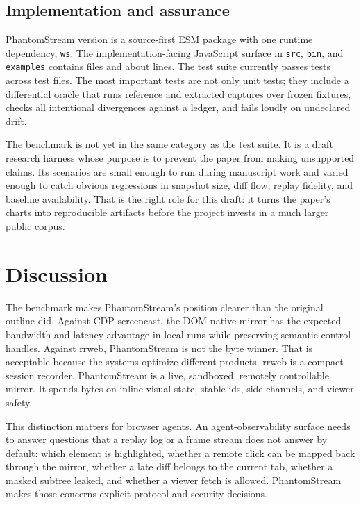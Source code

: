 \documentclass[conference]{IEEEtran}
\newcommand{\code}[1]{\texttt{\small #1}}
\begin{document}
\subsection{Implementation and assurance}

PhantomStream version \PSPackageVersion{} is a source-first ESM package with one
runtime dependency, \code{ws}. The implementation-facing JavaScript surface in
\code{src}, \code{bin}, and \code{examples} contains \PSProdFiles{} files and
about \PSProdLoc{} lines. The test suite currently passes \PSTestCount{} tests
across \PSTestFiles{} test files. The most important tests are not only unit
tests; they include a differential oracle that runs reference and extracted
captures over frozen fixtures, checks all intentional divergences against a
ledger, and fails loudly on undeclared drift.

The benchmark is not yet in the same category as the test suite. It is a draft
research harness whose purpose is to prevent the paper from making unsupported
claims. Its scenarios are small enough to run during manuscript work and varied
enough to catch obvious regressions in snapshot size, diff flow, replay fidelity,
and baseline availability. That is the right role for this draft: it turns the
paper's charts into reproducible artifacts before the project invests in a much
larger public corpus.

\section{Discussion}

The benchmark makes PhantomStream's position clearer than the original outline
did. Against CDP screencast, the DOM-native mirror has the expected bandwidth and
latency advantage in local runs while preserving semantic control handles. Against
rrweb, PhantomStream is not the byte winner. That is acceptable because the
systems optimize different products. rrweb is a compact session recorder.
PhantomStream is a live, sandboxed, remotely controllable mirror. It spends bytes
on inline visual state, stable ids, side channels, and viewer safety.

This distinction matters for browser agents. An agent-observability surface needs
to answer questions that a replay log or a frame stream does not answer by
default: which element is highlighted, whether a remote click can be mapped back
through the mirror, whether a late diff belongs to the current tab, whether a
masked subtree leaked, and whether a viewer fetch is allowed. PhantomStream makes
those concerns explicit protocol and security decisions.
\end{document}

